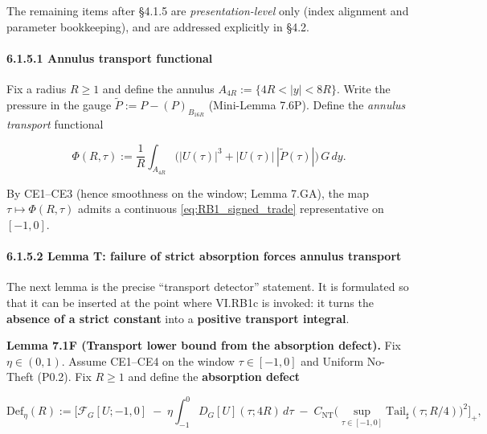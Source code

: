 \documentclass[
  11pt,
]{article}
\begin{document}
The remaining items after §4.1.5 are \emph{presentation-level} only (index alignment and parameter bookkeeping), and are addressed explicitly in §4.2.

\hypertarget{annulus-transport-functional}{%
\paragraph{6.1.5.1 Annulus transport functional}\label{annulus-transport-functional}}

Fix a radius \(R\ge 1\) and define the annulus \(A_{4R}:=\{4R<|y|<8R\}\). Write the pressure in the gauge \(\widetilde P:=P-(P)_{B_{16R}}\) (Mini-Lemma 7.6P). Define the \emph{annulus transport} functional

\begin{equation}
\Phi(R,\tau)
:=\frac1R\int_{A_{4R}}\Big(|U(\tau)|^3+|U(\tau)|\,|\widetilde P(\tau)|\Big)\,G\,dy.
\tag{7.1B0}\label{eq:7_1B0_def_Phi}
\end{equation}

By CE1--CE3 (hence smoothness on the window; Lemma 7.GA), the map \(\tau\mapsto \Phi(R,\tau)\) admits a continuous \eqref{eq:RB1_signed_trade} representative on \([-1,0]\).

\hypertarget{lemma-t-failure-of-strict-absorption-forces-annulus-transport}{%
\paragraph{6.1.5.2 Lemma T: failure of strict absorption forces annulus transport}\label{lemma-t-failure-of-strict-absorption-forces-annulus-transport}}

The next lemma is the precise ``transport detector'' statement. It is formulated so that it can be inserted at the point where VI.RB1c is invoked: it turns the \textbf{absence of a strict constant} into a \textbf{positive transport integral}.

\textbf{Lemma 7.1F (Transport lower bound from the absorption defect).} Fix \(\eta\in(0,1)\). Assume CE1--CE4 on the window \(\tau\in[-1,0]\) and Uniform No-Theft (P0.2). Fix \(R\ge 1\) and define the \textbf{absorption defect}

\begin{equation}
\mathrm{Def}_\eta(R)
:=\Bigg[
\mathcal F_G[U;-1,0]
\;-\;\eta\int_{-1}^{0}D_G[U](\tau;4R)\,d\tau
\;-\;C_{\mathrm{NT}}\Big(\sup_{\tau\in[-1,0]}\mathrm{Tail}_\sharp(\tau;R/4)\Big)^2
\Bigg]_+,
\tag{7.1B1a}\label{eq:7_1B1_defect}
\end{equation}
\end{document}
